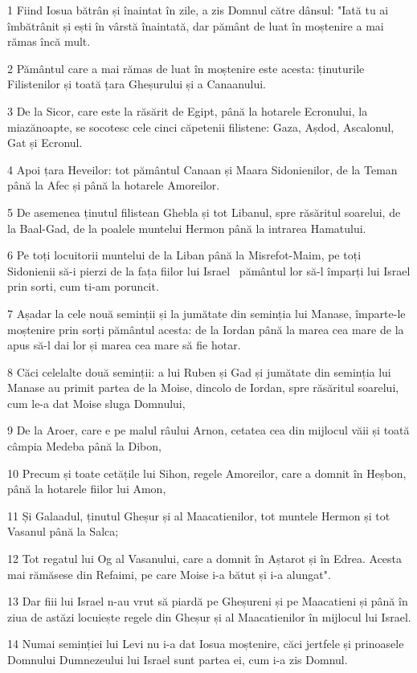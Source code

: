 \par 1 Fiind Iosua bătrân și înaintat în zile, a zis Domnul către dânsul: "Iată tu ai îmbătrânit și ești în vârstă înaintată, dar pământ de luat în moștenire a mai rămas încă mult.
\par 2 Pământul care a mai rămas de luat în moștenire este acesta: ținuturile Filistenilor și toată țara Gheșurului și a Canaanului.
\par 3 De la Sicor, care este la răsărit de Egipt, până la hotarele Ecronului, la miazănoapte, se socotesc cele cinci căpetenii filistene: Gaza, Așdod, Ascalonul, Gat și Ecronul.
\par 4 Apoi țara Heveilor: tot pământul Canaan și Maara Sidonienilor, de la Teman până la Afec și până la hotarele Amoreilor.
\par 5 De asemenea ținutul filistean Ghebla și tot Libanul, spre răsăritul soarelui, de la Baal-Gad, de la poalele muntelui Hermon până la intrarea Hamatului.
\par 6 Pe toți locuitorii muntelui de la Liban până la Misrefot-Maim, pe toți Sidonienii să-i pierzi de la fața fiilor lui Israel  pământul lor să-l împarți lui Israel prin sorti, cum ti-am poruncit.
\par 7 Așadar la cele nouă seminții și la jumătate din seminția lui Manase, împarte-le moștenire prin sorți pământul acesta: de la Iordan până la marea cea mare de la apus să-l dai lor și marea cea mare să fie hotar.
\par 8 Căci celelalte două seminții: a lui Ruben și Gad și jumătate din seminția lui Manase au primit partea de la Moise, dincolo de Iordan, spre răsăritul soarelui, cum le-a dat Moise sluga Domnului,
\par 9 De la Aroer, care e pe malul râului Arnon, cetatea cea din mijlocul văii și toată câmpia Medeba până la Dibon,
\par 10 Precum și toate cetățile lui Sihon, regele Amoreilor, care a domnit în Heșbon, până la hotarele fiilor lui Amon,
\par 11 Și Galaadul, ținutul Gheșur și al Maacatienilor, tot muntele Hermon și tot Vasanul până la Salca;
\par 12 Tot regatul lui Og al Vasanului, care a domnit în Aștarot și în Edrea. Acesta mai rămăsese din Refaimi, pe care Moise i-a bătut și i-a alungat".
\par 13 Dar fiii lui Israel n-au vrut să piardă pe Gheșureni și pe Maacatieni și până în ziua de astăzi locuiește regele din Gheșur și al Maacatienilor în mijlocul lui Israel.
\par 14 Numai seminției lui Levi nu i-a dat Iosua moștenire, căci jertfele și prinoasele Domnului Dumnezeului lui Israel sunt partea ei, cum i-a zis Domnul.
